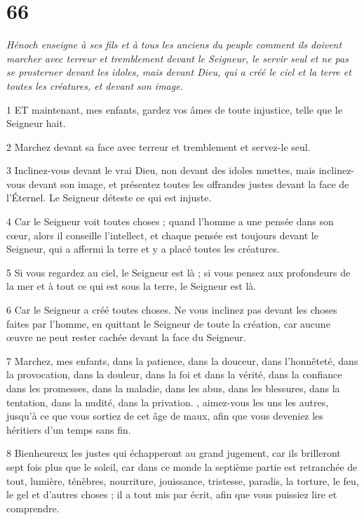 \chapter{66}

\par \textit{Hénoch enseigne à ses fils et à tous les anciens du peuple comment ils doivent marcher avec terreur et tremblement devant le Seigneur, le servir seul et ne pas se prosterner devant les idoles, mais devant Dieu, qui a créé le ciel et la terre et toutes les créatures, et devant son image.}

\par 1 ET maintenant, mes enfants, gardez vos âmes de toute injustice, telle que le Seigneur hait.

\par 2 Marchez devant sa face avec terreur et tremblement et servez-le seul.

\par 3 Inclinez-vous devant le vrai Dieu, non devant des idoles muettes, mais inclinez-vous devant son image, et présentez toutes les offrandes justes devant la face de l'Éternel. Le Seigneur déteste ce qui est injuste.

\par 4 Car le Seigneur voit toutes choses ; quand l'homme a une pensée dans son cœur, alors il conseille l'intellect, et chaque pensée est toujours devant le Seigneur, qui a affermi la terre et y a placé toutes les créatures.

\par 5 Si vous regardez au ciel, le Seigneur est là ; si vous pensez aux profondeurs de la mer et à tout ce qui est sous la terre, le Seigneur est là.

\par 6 Car le Seigneur a créé toutes choses. Ne vous inclinez pas devant les choses faites par l'homme, en quittant le Seigneur de toute la création, car aucune œuvre ne peut rester cachée devant la face du Seigneur.

\par 7 Marchez, mes enfants, dans la patience, dans la douceur, dans l'honnêteté, dans la provocation, dans la douleur, dans la foi et dans la vérité, dans la confiance dans les promesses, dans la maladie, dans les abus, dans les blessures, dans la tentation, dans la nudité, dans la privation. , aimez-vous les uns les autres, jusqu'à ce que vous sortiez de cet âge de maux, afin que vous deveniez les héritiers d'un temps sans fin.

\par 8 Bienheureux les justes qui échapperont au grand jugement, car ils brilleront sept fois plus que le soleil, car dans ce monde la septième partie est retranchée de tout, lumière, ténèbres, nourriture, jouissance, tristesse, paradis, la torture, le feu, le gel et d'autres choses ; il a tout mis par écrit, afin que vous puissiez lire et comprendre.

